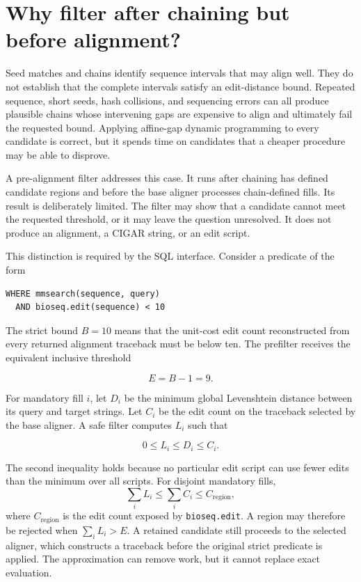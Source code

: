 \section{Why filter after chaining but before alignment?}
\label{sec:prefilter-role}

Seed matches and chains identify sequence intervals that may align well. They
do not establish that the complete intervals satisfy an edit-distance bound.
Repeated sequence, short seeds, hash collisions, and sequencing errors can all
produce plausible chains whose intervening gaps are expensive to align and
ultimately fail the requested bound. Applying affine-gap dynamic programming
to every candidate is correct, but it spends time on candidates that a cheaper
procedure may be able to disprove.

A pre-alignment filter addresses this case. It runs after chaining has defined
candidate regions and before the base aligner processes chain-defined fills.
Its result is deliberately limited. The filter may show that a candidate
cannot meet the requested threshold, or it may leave the question unresolved.
It does not produce an alignment, a CIGAR string, or an edit script.

This distinction is required by the SQL interface. Consider a predicate of the
form

\begin{verbatim}
WHERE mmsearch(sequence, query)
  AND bioseq.edit(sequence) < 10
\end{verbatim}

The strict bound \(B=10\) means that the unit-cost edit count reconstructed
from every returned alignment traceback must be below ten. The prefilter
receives the equivalent inclusive threshold

\[
    E = B - 1 = 9.
\]

For mandatory fill \(i\), let \(D_i\) be the minimum global Levenshtein
distance between its query and target strings. Let \(C_i\) be the edit count
on the traceback selected by the base aligner. A safe filter computes \(L_i\)
such that

\[
    0 \leq L_i \leq D_i \leq C_i.
\]

The second inequality holds because no particular edit script can use fewer
edits than the minimum over all scripts. For disjoint mandatory fills,
\[
    \sum_i L_i \leq \sum_i C_i \leq C_{\mathrm{region}},
\]
where \(C_{\mathrm{region}}\) is the edit count exposed by
\texttt{bioseq.edit}. A region may therefore be rejected when
\(\sum_iL_i>E\). A retained candidate still proceeds to the selected aligner,
which constructs a traceback before the original strict predicate is applied.
The approximation can remove work, but it cannot replace exact evaluation.

